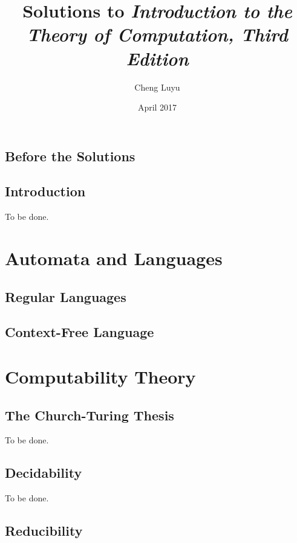 \documentclass[12pt]{report}
\begin{document}
\title{Solutions to \emph{Introduction to the Theory of Computation, Third Edition}}
\author{Cheng Luyu}
\date{April 2017}
\maketitle

\tableofcontents

\chapter{Before the Solutions}

\chapter{Introduction}

To be done.

\part{Automata and Languages}

\chapter{Regular Languages}



\chapter{Context-Free Language}



\part{Computability Theory}

\chapter{The Church-Turing Thesis}

To be done.

\chapter{Decidability}

To be done.

\chapter{Reducibility}
\end{document}
